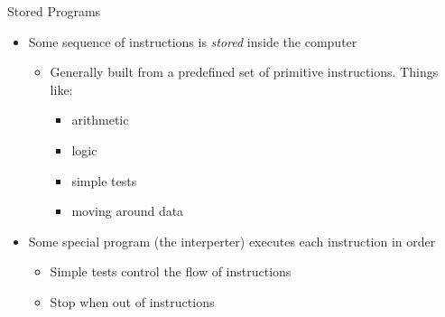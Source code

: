 \documentclass[pdf, aspectratio=169, 12pt]{beamer}
\begin{document}
\begin{frame}{Stored Programs}
	\begin{itemize}
		\item Some sequence of instructions is \emph{stored} inside the computer
			\begin{itemize}
				\item Generally built from a predefined set of primitive instructions. Things like:
					\begin{itemize}
						\item arithmetic
						\item logic
						\item simple tests
						\item moving around data
					\end{itemize}
			\end{itemize}
		\item Some special program (the interperter) executes each instruction in order
			\begin{itemize}
				\item Simple tests control the flow of instructions
				\item Stop when out of instructions
			\end{itemize}
	\end{itemize}
\end{frame}
\end{document}
